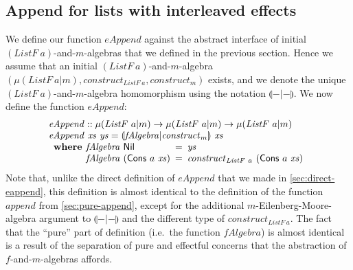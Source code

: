 \documentclass{jfp1}
\newcommand{\eFold}[2]{\llparenthesis #1|#2 \rrparenthesis}
\begin{document}
\subsection{Append for lists with interleaved effects}

We define our function $\mathit{eAppend}$ against the abstract
interface of initial $(\mathit{ListF}~a)$-and-$m$-algebras that we
defined in the previous section. Hence we assume that an initial
$(\mathit{ListF}~a)$-and-$m$-algebra $(\mu(\mathit{ListF}~a|m),
\mathit{construct}_{\mathit{ListF}~a}, \mathit{construct}_m)$ exists,
and we denote the unique $(\mathit{ListF}~a)$-and-$m$-algebra
homomorphism using the notation $\eFold{-}{-}$. We now define the
function $\mathit{eAppend}$:
\begin{displaymath}
  \begin{array}{l}
    \mathit{eAppend} :: \mu(\mathit{ListF}~a|m) \to \mu(\mathit{ListF}~a|m) \to \mu(\mathit{ListF}~a|m) \\
    \mathit{eAppend}~\mathit{xs}~\mathit{ys} = \eFold{\mathit{fAlgebra}}{\mathit{construct}_m}~\mathit{xs} \\
    \begin{array}{r@{\hspace{0.4em}}l@{\hspace{0.5em}}c@{\hspace{0.5em}}l}
      \textbf{where} & \mathit{fAlgebra}~\mathsf{Nil} &=& \mathit{ys} \\
                     & \mathit{fAlgebra}~(\mathsf{Cons}~a~\mathit{xs}) &=& \mathit{construct}_{\mathit{ListF}~a}~(\mathsf{Cons}~a~\mathit{xs})      
    \end{array}
  \end{array}
\end{displaymath}
Note that, unlike the direct definition of $\mathit{eAppend}$ that we
made in \autoref{sec:direct-eappend}, this definition is almost
identical to the definition of the function $\mathit{append}$ from
\autoref{sec:pure-append}, except for the additional
$m$-Eilenberg-Moore-algebra argument to $\eFold{-}{-}$ and the
different type of $\mathit{construct}_{\mathit{ListF}~a}$. The fact
that the ``pure'' part of definition (i.e.~the function
$\mathit{fAlgebra}$) is almost identical is a result of the separation
of pure and effectful concerns that the abstraction of
$f$-and-$m$-algebras affords.
\end{document}
